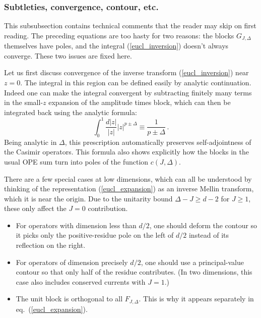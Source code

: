 \documentclass[11pt, reqno,preprint]{article}
\def\be{\begin{equation}}
\def\ee{\end{equation}}
\def\j{J}
\def\c{c}
\begin{document}
\subsubsection*{Subtleties, convergence, contour, etc.}

This subsubsection contains technical comments that the reader may skip on first reading.
The preceding equations are too hasty for two reasons: the blocks $G_{\j,\Delta}$ themselves
have poles, and the integral (\ref{eucl_inversion}) doesn't always converge.
These two issues are fixed here.

Let us first discuss convergence of the inverse transform (\ref{eucl_inversion}) near $z=0$.
The integral in this region can be defined easily by analytic continuation.
Indeed one can make the integral convergent by subtracting finitely many terms in the small-$z$ expansion of the amplitude times block, which can then be integrated back using the analytic formula:
\be
 \int_0^1 \frac{d|z|}{|z|} |z|^{p\pm \Delta} \equiv \frac{1}{p\pm\Delta}\,. \label{simple_radial_integral}
\ee
Being analytic in $\Delta$, this prescription automatically preserves self-adjointness of the Casimir operators.
This formula also shows explicitly how the blocks in the usual OPE sum turn into poles of the function $\c(\j,\Delta)$.

There are a few special cases at low dimensions, which can all be understood by thinking of the 
representation (\ref{eucl_expansion}) as an inverse Mellin transform, which it is near the origin.
Due to the unitarity bound $\Delta-\j\geq d-2$ for $\j\geq 1$,
these only affect the $\j=0$ contribution.
\begin{itemize}
\item For operators with dimension less than $d/2$, one should deform the contour so it
picks only the positive-residue pole on the left of $d/2$ instead of its reflection on the right.
\item For operators of dimension precisely $d/2$, one should use a principal-value contour so that only half of the residue contributes.
(In two dimensions, this case also includes conserved currents with $\j=1$.)
\item The unit block is orthogonal to all $F_{\j,\Delta}$. This is why it appears separately in eq.~(\ref{eucl_expansion}).
\end{itemize}
\end{document}
